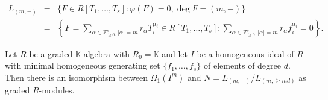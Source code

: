 \documentclass[10pt,a4paper]{amsart}
\begin{document}
\begin{eqnarray}
L_{(m,-)}    & =&\{F\in R[T_1, \ldots, T_s]:\varphi(F)=0, \deg{F}=(m,-)\} \nonumber\\
    & = &\left\{F=\sum_{\alpha\in\mathbb{Z}_{\geq 0}^s, |\alpha|=m} r_\alpha T_{i}^{\alpha_{i}}\in R[T_1,\ldots, T_s] : \sum_{\alpha\in\mathbb{Z}_{\geq 0}^s, |\alpha|=m}r_\alpha f_{i}^{\alpha_{i}}=0\right\}. \label{eq: L}
\end{eqnarray}

\begin{prop} \label{lem: crucial iso}
    Let $R$ be a graded $\mathbb{K}$-algebra  with $R_0=\mathbb{K}$ and let $I$ be a homogeneous ideal of $R$ with minimal homogeneous generating set $\{f_1, \dots, f_s\}$ of elements of degree $d$.
    Then there is an isomorphism between \(\Omega_1(I^m)\) and \(N =L_{(m,-)}/L_{(m,\geq md)}\) as graded $R$-modules.  
\end{prop}
\end{document}
